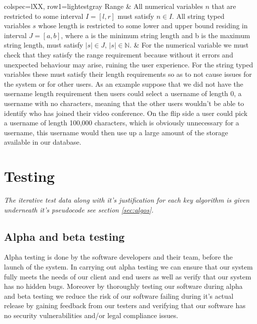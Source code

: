 \begin{longtblr}[
  caption={Data validation rules.}
]{colspec={lXX}, row{1}={lightestgray}}
Range & {All numerical variables $n$ that are restricted to some
interval $I = [l, r]$ must satisfy $n \in I$. All string typed variables $s$
whose length is restricted to some lower and upper bound residing in
interval $J = [a, b]$, where a is the minimum string length and b is 
the maximum string length,
must satisfy 
$\left|s\right| \in J, \, \left|s\right| \in \mathbb{N} $}. & {For 
the numerical variable we must check 
that they satisfy the range requirement because without it errors and
unexpected behaviour may arise, ruining the user experience. For the 
string typed variables these must satisfy their length requirements so as
to not cause issues for the system or for other users. As an example suppose
that we did not have the username length requirement then users could select 
a username of length 0, a username with no characters, meaning that the other 
users wouldn't be able to identify who has joined their video conference. On the
flip side a user could pick a username of length 100,000 characters, which is
obviously unnecessary for a username, this username would then use up a large 
amount of the storage available in our database.}\\

\end{longtblr}


\section{Testing}

\textit{The iterative test data along with it's
justification for each key algorithm is given
underneath it's pseudocode see section 
\ref{sec:algos}.}\\ \vspace{0.2cm}

\subsection{Alpha and beta testing}

Alpha testing is done by the software developers and their
team, before the launch of the system. In carrying out alpha
testing we can ensure that our system fully meets the needs
of our client and end users as well as verify that our system
has no hidden bugs. Moreover by thoroughly testing our
software during alpha and beta testing we reduce the risk
of our software failing during it's actual release by 
gaining feedback from our testers and verifying that our 
software has no security vulnerabilities and/or legal
compliance issues. \\ \vspace{0.2cm}

